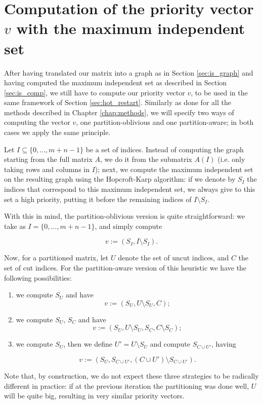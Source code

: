 \section{Computation of the priority vector $v$ with the maximum independent set}

After having translated our matrix into a graph as in Section \ref{sec:is_graph} and having computed the maximum independent set as described in Section \ref{sec:is_comp}, we still have to compute our priority vector $v$, to be used in the same framework of Section \ref{sec:hot_restart}. Similarly as done for all the methods described in Chapter \ref{chap:methods}, we will specify two ways of computing the vector $v$, one partition-oblivious and one partition-aware; in both cases we apply the same principle.

Let $I \subseteq \{ 0,\dots,m+n-1\}$ be a set of indices. Instead of computing the graph starting from the full matrix $A$, we do it from the submatrix $A(I)$ (i.e. only taking rows and columns in $I$); next, we compute the maximum independent set on the resulting graph using the Hopcroft-Karp algorithm: if we denote by $S_I$ the indices that correspond to this maximum independent set, we always give to this set a high priority, putting it before the remaining indices of $I \setminus S_I$. 

With this in mind, the partition-oblivious version is quite straightforward: we take as $I = \{ 0,\dots,m+n-1\}$, and simply compute

\[
	v := (S_I,I \setminus S_I).
\]

Now, for a partitioned matrix, let $U$ denote the set of uncut indices, and $C$ the set of cut indices. For the partition-aware version of this heuristic we have the following possibilities:

\begin{enumerate}
	\item we compute $S_U$ and have 
\[
	v := (S_U,U \setminus S_U, C);
\]

	\item we compute $S_U$, $S_C$ and have
\[
		v := (S_U, U \setminus S_U, S_C, C \setminus S_C);
\]

	\item we compute $S_U$, then we define $U' = U \setminus S_U$ and compute $S_{C \cup U'}$, having

		\[
			v:= (S_U, S_{C \cup U'}, (C \cup U') \setminus S_{C \cup U'}).
		\]
\end{enumerate}

Note that, by construction, we do not expect these three strategies to be radically different in practice: if at the previous iteration the partitioning was done well, $U$ will be quite big, resulting in very similar priority vectors.
